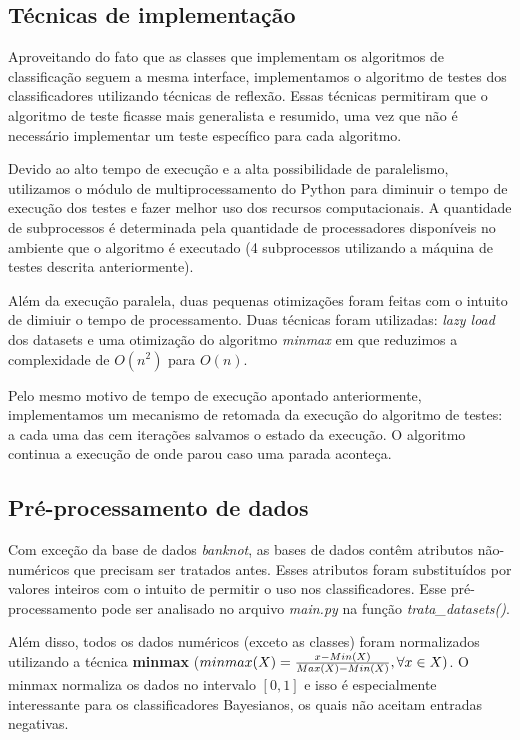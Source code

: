 \documentclass[11pt]{article}
\begin{document}
\subsection{Técnicas de implementação}

Aproveitando do fato que as classes que implementam os algoritmos de
classificação seguem a mesma interface, implementamos o algoritmo de testes dos
classificadores utilizando técnicas de reflexão. Essas técnicas permitiram que o
algoritmo de teste ficasse mais generalista e resumido, uma vez que não é
necessário implementar um teste específico para cada algoritmo.

Devido ao alto tempo de execução e a alta possibilidade de paralelismo,
utilizamos o módulo de multiprocessamento do Python para diminuir o tempo de
execução dos testes e fazer melhor uso dos recursos computacionais. A
quantidade de subprocessos é determinada pela quantidade de processadores
disponíveis no ambiente que o algoritmo é executado (4 subprocessos utilizando
a máquina de testes descrita anteriormente).

Além da execução paralela, duas pequenas otimizações foram feitas com o intuito
de dimiuir o tempo de processamento. Duas técnicas foram utilizadas:
\textit{lazy load} dos datasets e uma otimização do algoritmo \textit{minmax}
em que reduzimos a complexidade de $O(n^2)$ para $O(n)$.


Pelo mesmo motivo de tempo de execução apontado anteriormente, implementamos um
mecanismo de retomada da execução do algoritmo de testes: a cada uma das cem
iterações salvamos o estado da execução. O algoritmo continua a execução de
onde parou caso uma parada aconteça.

\subsection{Pré-processamento de dados}

Com exceção da base de dados \textit{banknot}, as bases de dados contêm
atributos não-numéricos que precisam ser tratados antes. Esses atributos foram
substituídos por valores inteiros com o intuito de permitir o uso nos
classificadores. Esse pré-processamento pode ser analisado no arquivo
\textit{main.py} na função \textit{trata\_datasets()}.

Além disso, todos os dados numéricos (exceto as classes) foram normalizados
utilizando a técnica \textbf{minmax} ($minmax(X) = {x-Min(X)\over{Max(X)-Min(X)}}, \forall x \in X)$. 
O minmax normaliza os dados no intervalo $[0,1]$ e isso é especialmente
interessante para os classificadores Bayesianos, os quais não aceitam entradas
negativas.
\end{document}
